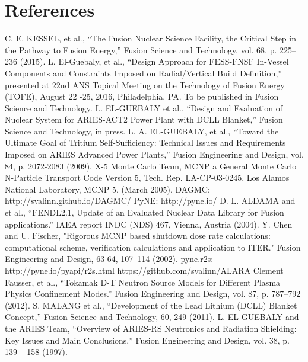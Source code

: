 \documentclass[12pt, letterpaper]{elsarticle}
\begin{document}
\newpage
\section{References}
\begin{thebibliography}{13} 
C. E. KESSEL, et al., {“The Fusion Nuclear Science Facility, the Critical Step in the Pathway to Fusion Energy,” Fusion Science and Technology, vol. 68, p. 225–236 (2015).}
L. El-Guebaly, et al., {“Design Approach for FESS-FNSF In-Vessel Components and Constraints Imposed on Radial/Vertical Build Definition,” presented at 22nd ANS Topical Meeting on the Technology of Fusion Energy (TOFE), August 22 -25, 2016, Philadelphia, PA. To be published in Fusion Science and Technology.}
L. EL-GUEBALY et al., {“Design and Evaluation of Nuclear System for ARIES-ACT2 Power Plant with DCLL Blanket,” Fusion Science and Technology, in press.}
L. A. EL-GUEBALY, et al., {“Toward the Ultimate Goal of Tritium Self-Sufficiency: Technical Issues and Requirements Imposed on ARIES Advanced Power Plants,” Fusion Engineering and Design, vol. 84, p. 2072-2083 (2009).}
X-5 Monte Carlo Team, {MCNP a General Monte Carlo N-Particle Transport Code Version 5, Tech. Rep. LA-CP-03-0245, Los Alamos National Laboratory, MCNP 5, (March 2005).}
{DAGMC: http://svalinn.github.io/DAGMC/}
{PyNE: http://pyne.io/} 
D. L. ALDAMA and et al., {“FENDL2.1, Update of an Evaluated Nuclear Data Library for Fusion applications.” IAEA report INDC (NDS) 467, Vienna, Austria (2004).}
Y. Chen and U. Fischer, {"Rigorous MCNP based shutdown dose rate calculations: computational scheme, verification calculations and application to ITER." Fusion Engineering and Design, 63-64, 107–114 (2002).}
{pyne.r2s: http://pyne.io/pyapi/r2s.html}
{https://github.com/svalinn/ALARA}
Clement Fausser, et al., {“Tokamak D-T Neutron Source Models for Different Plasma Physics Confinement Modes.” Fusion Engineering and Design, vol. 87, p. 787–792 (2012).}
S. MALANG et al., {“Development of the Lead Lithium (DCLL) Blanket Concept,” Fusion Science and Technology, 60, 249 (2011).}
L. EL-GUEBALY and the ARIES Team, {“Overview of ARIES-RS Neutronics and Radiation Shielding: Key Issues and Main Conclusions,” Fusion Engineering and Design, vol. 38, p. 139 – 158 (1997).}
\end{thebibliography}
\end{document}
